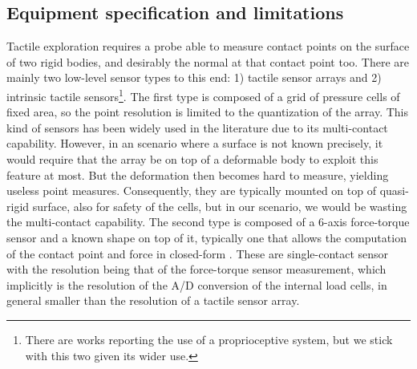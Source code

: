 


\subsection{Equipment specification and limitations}
\label{sec:limitations}

Tactile exploration requires a probe able to measure contact points on the surface of two rigid bodies, and desirably the normal at that contact point too. There are mainly two low-level sensor types to this end: 1) tactile sensor arrays and 2) intrinsic tactile sensors\footnote{There are works reporting the use of a proprioceptive system, but we stick with this two given its wider use.}. The first type is composed of a grid of pressure cells of fixed area, so the point resolution is limited to the quantization of the array. This kind of sensors has been widely used in the literature due to its multi-contact capability. However, in an scenario where a surface is not known precisely, it would require that the array be on top of a deformable body to exploit this feature at most. But the deformation then becomes hard to measure, yielding useless point measures. Consequently, they are typically mounted on top of quasi-rigid surface, also for safety of the cells, but in our scenario, we would be wasting the multi-contact capability. The second type is composed of a $6$-axis force-torque sensor and a known shape on top of it, typically one that allows the computation of the contact point and force in closed-form \citep{Bicchi1993Contact}. These are single-contact sensor with the resolution being that of the force-torque sensor measurement, which implicitly is the resolution of the A/D conversion of the internal load cells, in general smaller than the resolution of a tactile sensor array.

